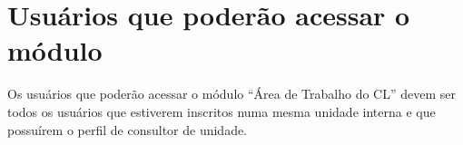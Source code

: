 \section{Usuários que poderão acessar o módulo}

Os usuários que poderão acessar o módulo ``Área de Trabalho do CL'' devem ser todos os usuários que estiverem inscritos numa mesma unidade interna e que possuírem o perfil de consultor de unidade.


	

